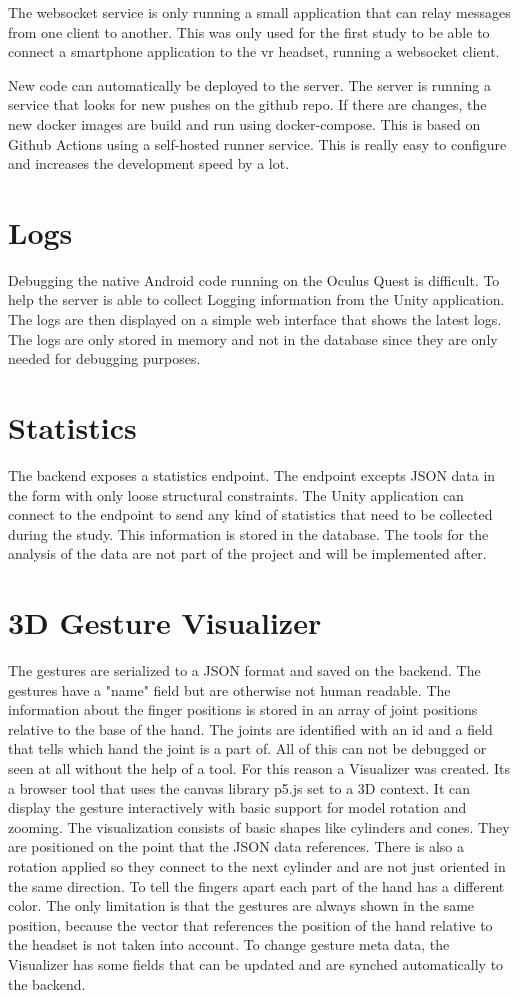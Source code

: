 The websocket service is only running a small application that can relay messages from one client to another. This was only used for the first study to be able to connect a smartphone application to the vr headset, running a websocket client.

New code can automatically be deployed to the server. The server is running a service that looks for new pushes on the github repo. If there are changes, the new docker images are build and run using docker-compose. This is based on Github Actions using a self-hosted runner service. This is really easy to configure and increases the development speed by a lot. 


\section{Logs}
Debugging the native Android code running on the Oculus Quest is difficult. To help the server is able to collect Logging information from the Unity application. The logs are then displayed on a simple web interface that shows the latest logs. The logs are only stored in memory and not in the database since they are only needed for debugging purposes. 


\section{Statistics}
The backend exposes a statistics endpoint. The endpoint excepts JSON data in the form with only loose structural constraints. The Unity application can connect to the endpoint to send any kind of statistics that need to be collected during the study. This information is stored in the database. The tools for the analysis of the data are not part of the project and will be implemented after.  


\section{3D Gesture Visualizer}
The gestures are serialized to a JSON format and saved on the backend. The gestures have a "name" field but are otherwise not human readable. The information about the finger positions is stored in an array of joint positions relative to the base of the hand. The joints are identified with an id and a field that tells which hand the joint is a part of. All of this can not be debugged or seen at all without the help of a tool. For this reason a Visualizer was created. Its a browser tool that uses the canvas library p5.js set to a 3D context. It can display the gesture interactively with basic support for model rotation and zooming. The visualization consists of basic shapes like cylinders and cones. They are positioned on the point that the JSON data references. There is also a rotation applied so they connect to the next cylinder and are not just oriented in the same direction. To tell the fingers apart each part of the hand has a different color. The only limitation is that the gestures are always shown in the same position, because the vector that references the position of the hand relative to the headset is not taken into account. To change gesture meta data, the Visualizer has some fields that can be updated and are synched automatically to the backend.


